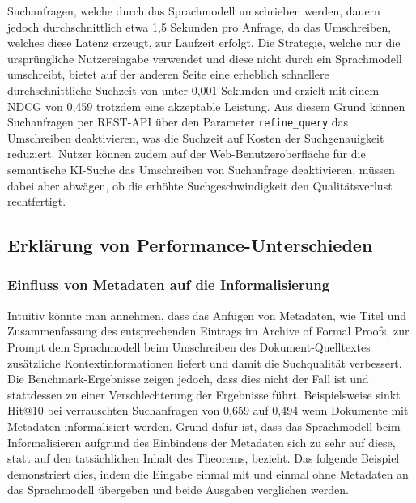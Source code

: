 \documentclass[12pt,letterpaper]{article} %
\begin{document}
Suchanfragen, welche durch das Sprachmodell umschrieben werden, dauern jedoch durchschnittlich etwa 1,5 Sekunden pro Anfrage, da das Umschreiben, welches diese Latenz erzeugt, zur Laufzeit erfolgt.
Die Strategie, welche nur die ursprüngliche Nutzereingabe verwendet und diese nicht durch ein Sprachmodell umschreibt, bietet auf der anderen Seite eine erheblich schnellere durchschnittliche Suchzeit von unter 0,001 Sekunden und erzielt mit einem NDCG von 0,459 trotzdem eine akzeptable Leistung.
Aus diesem Grund können Suchanfragen per REST-API über den Parameter \texttt{refine\_query} das Umschreiben deaktivieren, was die Suchzeit auf Kosten der Suchgenauigkeit reduziert.
Nutzer können zudem auf der Web-Benutzeroberfläche für die semantische KI-Suche das Umschreiben von Suchanfrage deaktivieren, müssen dabei aber abwägen, ob die erhöhte Suchgeschwindigkeit den Qualitätsverlust rechtfertigt.

\subsection{Erklärung von Performance-Unterschieden}

\subsubsection{Einfluss von Metadaten auf die Informalisierung}
\label{sec:einfluss_metadate_informalisierung}

Intuitiv könnte man annehmen, dass das Anfügen von Metadaten, wie Titel und Zusammenfassung des entsprechenden Eintrags im Archive of Formal Proofs, zur Prompt dem Sprachmodell beim Umschreiben des Dokument-Quelltextes zusätzliche Kontextinformationen liefert und damit die Suchqualität verbessert.
Die Benchmark-Ergebnisse zeigen jedoch, dass dies nicht der Fall ist und stattdessen zu einer Verschlechterung der Ergebnisse führt.
Beispielsweise sinkt Hit@10 bei verrauschten Suchanfragen von 0,659 auf 0,494 wenn Dokumente mit Metadaten informalisiert werden.
Grund dafür ist, dass das Sprachmodell beim Informalisieren aufgrund des Einbindens der Metadaten sich zu sehr auf diese, statt auf den tatsächlichen Inhalt des Theorems, bezieht.
Das folgende Beispiel demonstriert dies, indem die Eingabe einmal mit und einmal ohne Metadaten an das Sprachmodell übergeben und beide Ausgaben verglichen werden.
\end{document}
